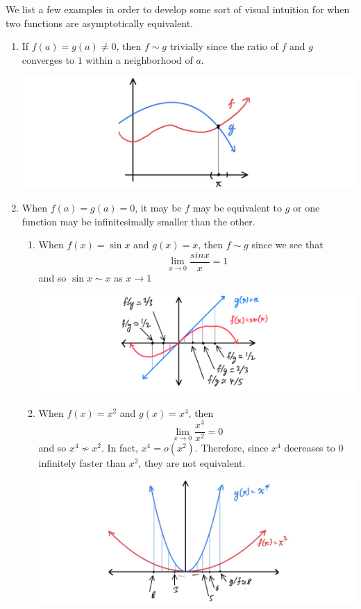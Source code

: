 \documentclass{article}
\begin{document}
    We list a few examples in order to develop some sort of visual intuition for when two functions are asymptotically equivalent. 
    \begin{enumerate}
      \item If $f(a) = g(a) \neq 0$, then $f \sim g$ trivially since the ratio of $f$ and $g$ converges to $1$ within a neighborhood of $a$. 
      \begin{center}
          \includegraphics[scale=0.3]{img/trivial_case_equal_value.jpg}
      \end{center}
      \item When $f(a) = g(a) = 0$, it may be $f$ may be equivalent to $g$ or one function may be infinitesimally smaller than the other. 
      \begin{enumerate}
        \item When $f(x) = \sin{x}$ and $g(x) = x$, then $f \sim g$ since we see that 
        \[\lim_{x \rightarrow 0} \frac{sin{x}}{x} = 1\]
        and so $\sin{x} \sim x$ as $x \rightarrow 1$
        \begin{center}
            \includegraphics[scale=0.25]{img/x_vs_sin_x.PNG}
        \end{center}
        \item When $f(x) = x^2$ and $g(x) = x^4$, then  \[\lim_{x \rightarrow 0} \frac{x^4}{x^2} = 0\]
        and so $x^4 \not\sim x^2$. In fact, $x^4 = o(x^2)$. Therefore, since $x^4$ decreases to $0$ infinitely faster than $x^2$, they are not equivalent. 
        \begin{center}
            \includegraphics[scale=0.25]{img/x_fourth_vs_x_squared.jpg}

\end{center}
\end{enumerate}
\end{enumerate}
\end{document}
